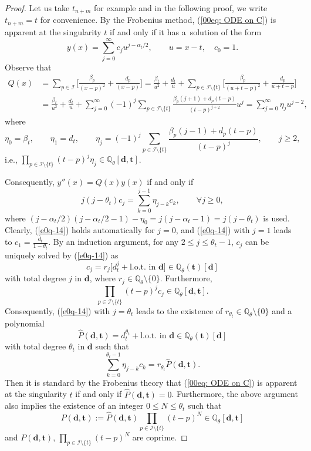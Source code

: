\documentclass[pdftex]{sigma}
\numberwithin{equation}{section}
\def\Q{\mathbb Q}
\begin{document}
\begin{proof} Let us take $t_{n+m}$ for example and in the following proof, we write $t_{n+m}=t$ for convenience. By the Frobenius method, (\ref{00eq: ODE on C}) is apparent at the singularity $t$ if and only if it has a~solution of the form
\[y(x)=\sum_{j=0}^{\infty}c_j u^{j-\alpha_{t}/2},\qquad u=x-t,\quad c_0=1.\]
Observe that
{\allowdisplaybreaks
\begin{align*}
Q(x)&=\sum_{p\in\mathcal{I}}\biggl[\frac{\beta_p}{(x-p)^2}+\frac{d_p}{(x-p)}\biggr]
=
\frac{\beta_t}{u^2}+\frac{d_t}{u}
+\sum_{p\in\mathcal{I}\setminus\{t\}}
\biggl[\frac{\beta_p}{(u+t-p)^2}+\frac{d_p}{u+t-p}\biggr]\\
&=\frac{\beta_t}{u^2}+\frac{d_t}{u}
+\sum_{j=0}^\infty(-1)^{j} \sum_{p\in\mathcal{I}\setminus\{t\}}\frac{\beta_p(j+1)+d_p(t-p)}{(t-p)^{j+2}}u^j
=\sum_{j=0}^{\infty}\eta_j u^{j-2},
\end{align*}
}%
where
\[\eta_0=\beta_t,\qquad \eta_1=d_t,\qquad
 \eta_j=(-1)^{j} \sum_{p\in\mathcal{I}\setminus\{t\}}\frac{\beta_p(j-1)+d_p(t-p)}{(t-p)^{j}},\qquad j\geq 2,
 \]
i.e., $\prod_{p\in\mathcal{I}\setminus\{t\}}(t-p)^j\eta_j\in \Q_\theta[\boldsymbol d,\boldsymbol t]$.

Consequently, $y''(x)=Q(x)y(x)$ if and only if
\begin{equation}\label{e0q-14}
j(j-\theta_t)c_j=\sum_{k=0}^{j-1}\eta_{j-k}c_k,\qquad\forall j\geq 0,
\end{equation}
where $(j-\alpha_t/2)(j-\alpha_t/2-1)-\eta_0=j(j-\alpha_t-1)=j(j-\theta_t)$ is used. Clearly, (\ref{e0q-14}) holds automatically for $j=0$, and (\ref{e0q-14}) with $j=1$ leads to $c_1=\frac{d_t}{1-\theta_t}$. By an induction argument, for any $2\leq j\leq \theta_t-1$, $c_j$ can be uniquely solved by (\ref{e0q-14}) as
\[c_j=r_j\bigl[d_{t}^j+\text{l.o.t. in $\boldsymbol d$}\bigr]\in \Q_\theta(\boldsymbol t)[\boldsymbol d]\]
with total degree $j$ in $\boldsymbol d$,
where $r_j\in\Q_\theta\setminus\{0\}$. Furthermore,
\[\prod_{p\in\mathcal{I}\setminus\{t\}}(t-p)^j c_j\in \Q_\theta[\boldsymbol d,\boldsymbol t].\]
Consequently, (\ref{e0q-14}) with $j=\theta_t$ leads to the existence of $r_{\theta_t}\in\Q_\theta\setminus\{0\}$ and a polynomial
\[\hat{P}(\boldsymbol d, \boldsymbol t)=d_t^{\theta_t}+\text{l.o.t.\ in $\boldsymbol d$}\in \Q_\theta(\boldsymbol t)[\boldsymbol d]\]
with total degree $\theta_t$ in $\boldsymbol d$ such that
\[
 \sum_{k=0}^{\theta_t-1}\eta_{j-k}c_k=r_{\theta_t}
 \hat{P}(\boldsymbol d, \boldsymbol t).
\]
Then it is standard by the Frobenius theory that (\ref{00eq: ODE on
 C}) is apparent at the singularity $t$ if and only if
$\hat{P}(\boldsymbol d, \boldsymbol t)=0$.
Furthermore, the above argument also implies the existence of an integer $0\leq N\leq \theta_t$ such that
\[
 P(\boldsymbol d, \boldsymbol t):=\hat{P}(\boldsymbol d, \boldsymbol
 t)\prod_{p\in\mathcal{I}\setminus\{t\}}(t-p)^{N}\in
 \Q_\theta[\boldsymbol d,\boldsymbol t]
\]
and $P(\boldsymbol d, \boldsymbol t)$, $\prod_{p\in\mathcal{I}\setminus\{t\}}(t-p)^{N}$ are coprime.
\end{proof}
\end{document}
